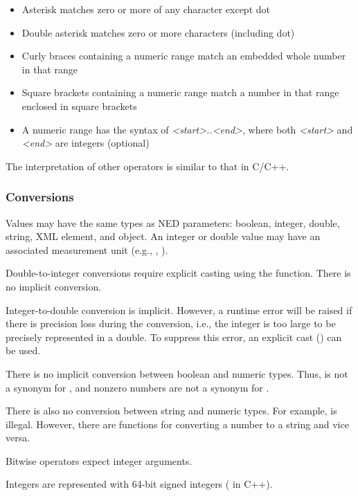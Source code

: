 \begin{itemize}
  \item Asterisk \ttt{*} matches zero or more of any character except dot
  \item Double asterisk \ttt{**} matches zero or more characters (including dot)
  \item Curly braces containing a numeric range match an embedded whole number in that range
  \item Square brackets containing a numeric range match a number in that range
    enclosed in square brackets
  \item A numeric range has the syntax of \textit{<start>..<end>}, where both
    \textit{<start>} and \textit{<end>} are integers (optional)
\end{itemize}

The interpretation of other operators is similar to that in C/C++.


\subsubsection{Conversions}
\label{sec:ned-ref:conversions}

Values may have the same types as NED parameters: boolean, integer, double,
string, XML element, and object. An integer or double value may have an
associated measurement unit (e.g., , ).

Double-to-integer conversions require explicit casting using the 
function. There is no implicit conversion.

Integer-to-double conversion is implicit. However, a runtime error will be
raised if there is precision loss during the conversion, i.e., the integer is
too large to be precisely represented in a double. To suppress this error, an
explicit cast () can be used.

There is no implicit conversion between boolean and numeric types. Thus, 
is not a synonym for , and nonzero numbers are not a synonym for
.

There is also no conversion between string and numeric types. For example,
 is illegal. However, there are functions for converting a number
to a string and vice versa.

Bitwise operators expect integer arguments.

\begin{note}
Integers are represented with 64-bit signed integers ( in C++).
\end{note}


